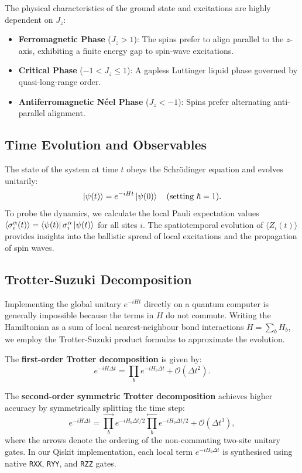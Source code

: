\documentclass[11pt,a4paper]{article}
\begin{document}
The physical characteristics of the ground state and excitations are highly dependent on $J_z$:
\begin{itemize}
    \item \textbf{Ferromagnetic Phase} ($J_z > 1$): The spins prefer to align parallel to the $z$-axis, exhibiting a finite energy gap to spin-wave excitations.
    \item \textbf{Critical Phase} ($-1 < J_z \leq 1$): A gapless Luttinger liquid phase governed by quasi-long-range order.
    \item \textbf{Antiferromagnetic N\'eel Phase} ($J_z < -1$): Spins prefer alternating anti-parallel alignment.
\end{itemize}

\subsection{Time Evolution and Observables}
The state of the system at time $t$ obeys the Schr\"odinger equation and evolves unitarily:
\begin{equation}
\ket{\psi(t)} = e^{-iHt} \ket{\psi(0)} \quad (\text{setting } \hbar = 1).
\end{equation}
To probe the dynamics, we calculate the local Pauli expectation values $\langle \sigma_i^\alpha(t) \rangle = \bra{\psi(t)} \sigma_i^\alpha \ket{\psi(t)}$ for all sites $i$. The spatiotemporal evolution of $\langle Z_i(t) \rangle$ provides insights into the ballistic spread of local excitations and the propagation of spin waves.

\subsection{Trotter-Suzuki Decomposition}
Implementing the global unitary $e^{-iHt}$ directly on a quantum computer is generally impossible because the terms in $H$ do not commute. Writing the Hamiltonian as a sum of local nearest-neighbour bond interactions $H = \sum_b H_b$, we employ the Trotter-Suzuki product formulas to approximate the evolution.

The \textbf{first-order Trotter decomposition} is given by:
\begin{equation}
e^{-iH\Delta t} = \prod_b e^{-iH_b\Delta t} + \mathcal{O}(\Delta t^2).
\end{equation}

The \textbf{second-order symmetric Trotter decomposition} achieves higher accuracy by symmetrically splitting the time step:
\begin{equation}
e^{-iH\Delta t} = \prod_b^{\rightarrow} e^{-iH_b\Delta t / 2} \prod_b^{\leftarrow} e^{-iH_b\Delta t / 2} + \mathcal{O}(\Delta t^3),
\end{equation}
where the arrows denote the ordering of the non-commuting two-site unitary gates. In our Qiskit implementation, each local term $e^{-iH_b \Delta t}$ is synthesised using native \texttt{RXX}, \texttt{RYY}, and \texttt{RZZ} gates.
\end{document}
